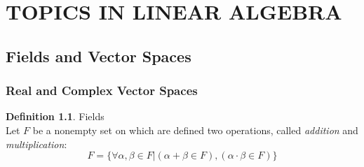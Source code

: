 \documentclass{book}
\theoremstyle{definition}
\newtheorem{definition}{Definition}[section]
\theoremstyle{remark}
\newcommand{\m}{\cdot}
\begin{document}
\newpage
\chapter{TOPICS IN LINEAR ALGEBRA}
\section{Fields and Vector Spaces}
\subsection{Real and Complex Vector Spaces}


\begin{definition}
Fields \\
    
    Let $F$ be a nonempty set on which are defined two operations, called \textit{addition} and \textit{multiplication}: 
        \begin{equation*}
            F = \{ \forall \alpha, \beta \in F | (\alpha + \beta \in F),(\alpha \m \beta \in F) \}
        \end{equation*}
\end{definition}
\end{document}
